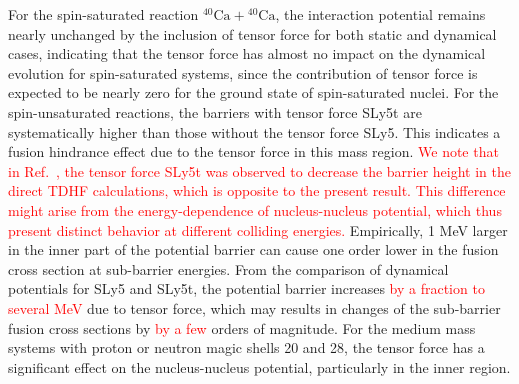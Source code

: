 \documentclass[aps,prc,twocolumn,showpacs,superscriptaddress,longbibliography,nofootinbib,floatfix,10pt]{revtex4-1}
\begin{document}
For the spin-saturated reaction $^{40}\mathrm{Ca}+\mathrm{^{40}Ca}$, the interaction potential remains nearly unchanged by the inclusion of tensor force
for both static and dynamical cases, indicating that the tensor force has almost no impact on the dynamical evolution for spin-saturated systems,
since the contribution of tensor force is expected to be nearly zero for the ground state of spin-saturated nuclei.
For the spin-unsaturated reactions, the barriers with tensor force SLy5t are systematically higher than those without the tensor force SLy5.
This indicates a fusion hindrance effect due to the tensor force in this mass region. \textcolor{red}{We note that in Ref.~\cite{Guo2018_PLB782-401}, the 
tensor force SLy5t was observed to decrease the barrier height in the direct TDHF calculations, which is opposite to the present result. 
This difference might arise from the energy-dependence of nucleus-nucleus potential, which thus present distinct behavior at different 
colliding energies.} Empirically, 1 MeV larger in the inner part of the potential barrier
can cause one order lower in the fusion cross section at sub-barrier energies. From the comparison of dynamical potentials for SLy5 and SLy5t,
the potential barrier increases \textcolor{red} {by a fraction to several MeV} due to tensor force, which may results in changes of the sub-barrier fusion cross sections by \textcolor{red} {by a few} orders of magnitude. For the medium mass systems
with proton or neutron magic shells 20 and 28, the tensor force has a significant effect on the nucleus-nucleus potential, particularly in the inner region.
\end{document}
